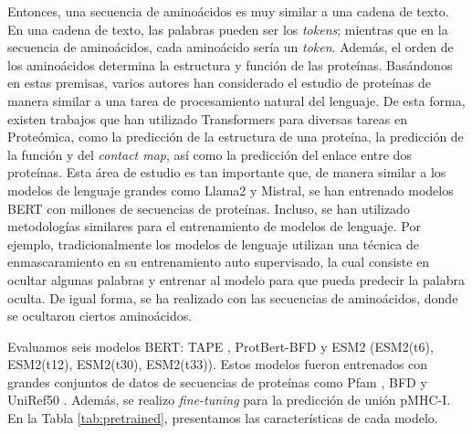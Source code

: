 Entonces, una secuencia de aminoácidos es muy similar a una cadena de texto. En una cadena de texto, las palabras pueden ser los \textit{tokens}; mientras que en la secuencia de aminoácidos, cada aminoácido sería un \textit{token}. Además, el orden de los aminoácidos determina la estructura y función de las proteínas. Basándonos en estas premisas, varios autores han considerado el estudio de proteínas de manera similar a una tarea de procesamiento natural del lenguaje. De esta forma, existen trabajos que han utilizado Transformers para diversas tareas en Proteómica, como la predicción de la estructura de una proteína, la predicción de la función y del \textit{contact map}, así como la predicción del enlace entre dos proteínas. Esta área de estudio es tan importante que, de manera similar a los modelos de lenguaje grandes como Llama2 y Mistral, se han entrenado modelos BERT con millones de secuencias de proteínas. Incluso, se han utilizado metodologías similares para el entrenamiento de modelos de lenguaje. Por ejemplo, tradicionalmente los modelos de lenguaje utilizan una técnica de enmascaramiento en su entrenamiento auto supervisado, la cual consiste en ocultar algunas palabras y entrenar al modelo para que pueda predecir la palabra oculta. De igual forma, se ha realizado con las secuencias de aminoácidos, donde se ocultaron ciertos aminoácidos. 

Evaluamos seis modelos BERT: TAPE \citep{rao2019evaluating}, ProtBert-BFD \citep{elnaggar2021prottrans} y ESM2 \citep{lin2023evolutionary} (ESM2(t6), ESM2(t12), ESM2(t30), ESM2(t33)). Estos modelos fueron entrenados con grandes conjuntos de datos de secuencias de proteínas como Pfam \citep{el2019pfam},  BFD y UniRef50 \citep{suzek2015uniref}. Además, se realizo \textit{fine-tuning } para la predicción de unión pMHC-I. En la Tabla \ref{tab:pretrained}, presentamos las características de cada modelo.

